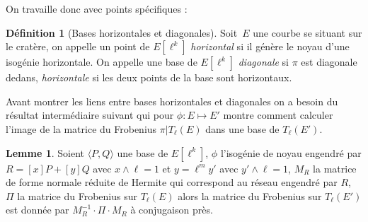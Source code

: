 \documentclass[10pt,a4paper]{book}
\theoremstyle{plain}
\theoremstyle{definition}
\newtheorem{lem}[thm]{Lemme}
\theoremstyle{definition}
\theoremstyle{definition}
\theoremstyle{definition}
\newtheorem{defi}[thm]{Définition}
\theoremstyle{remark}
\theoremstyle{remark}
\theoremstyle{definition}
\begin{document}
On travaille donc avec points spécifiques :


\begin{defi}[Bases horizontales et diagonales]
  Soit~$E$ une courbe se situant sur le cratère, 
  on appelle un point de $E[\ell^k]$ \emph{horizontal} 
  si il génère le noyau d'une isogénie horizontale. 
  On appelle une base de $E[\ell^k]$ \emph{diagonale} 
  si $\pi$ est diagonale dedans, \emph{horizontale} si 
  les deux points de la base sont horizontaux.
\end{defi}

Avant montrer les liens entre bases horizontales et diagonales on a besoin du résultat intermédiaire suivant qui pour $\phi:E \mapsto E'$ montre comment calculer l'image de la matrice du Frobenius $\pi|T_{\ell}(E)$ dans une base de $T_{\ell}(E')$.

\begin{lem}
\label{lem:iso:con}
Soient $\langle P, Q \rangle$ une base de $E[\ell^k]$, $\phi$ l'isogénie de noyau engendré par $R=[x]P+[y]Q$  avec $x\wedge \ell =1$ et $y=\ell^my'$ avec $y' \wedge \ell =1$, $M_R$ la matrice de forme normale réduite de Hermite qui correspond au réseau engendré par $R$,  $\Pi$ la matrice du Frobenius sur $T_{\ell}(E)$ alors la matrice du Frobenius sur $T_{\ell}(E')$ est donnée par $M_R^{-1} \cdot \Pi \cdot M_R$ à conjugaison près.
\end{lem}
\end{document}
